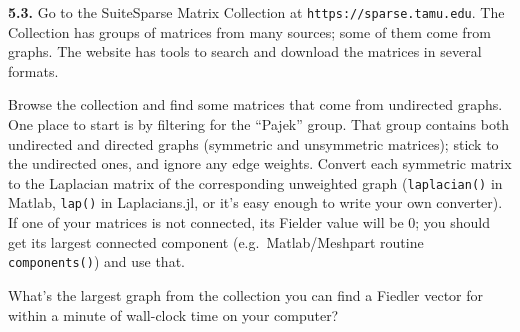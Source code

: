 \documentclass[11pt]{article}
\begin{document}
\par\bigskip
{\bf 5.3.} 
Go to the SuiteSparse Matrix Collection at {\tt https://sparse.tamu.edu}.
The Collection has groups of matrices from many sources;
some of them come from graphs.
The website has tools to search and download the matrices in several formats.

Browse the collection and find some matrices that come from undirected graphs. 
One place to start is by filtering for the ``Pajek'' group.
That group contains both undirected and directed graphs 
(symmetric and unsymmetric matrices); 
stick to the undirected ones, and ignore any edge weights. 
Convert each symmetric matrix to the Laplacian matrix of the 
corresponding unweighted graph
({\tt laplacian()} in Matlab, {\tt lap()} in Laplacians.jl,
or it's easy enough to write your own converter).
If one of your matrices is not connected, its Fielder value will be 0;
you should get its largest connected component 
(e.g.\ Matlab/Meshpart routine {\tt components()}) and use that.

What's the largest graph from the collection you can find a Fiedler vector 
for within a minute of wall-clock time on your computer?
\end{document}
